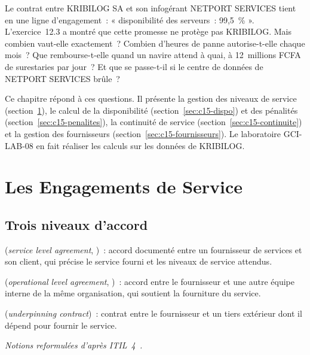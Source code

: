 Le contrat entre KRIBILOG SA et son infogérant NETPORT SERVICES tient en
une ligne d'engagement~: « disponibilité des serveurs~: 99,5~\% ».
L'exercice~12.3 a montré que cette promesse ne protège pas KRIBILOG.
Mais combien vaut-elle exactement~? Combien d'heures de panne
autorise-t-elle chaque mois~? Que rembourse-t-elle quand un navire attend
à quai, à 12~millions FCFA de surestaries par jour~? Et que se passe-t-il si
le centre de données de NETPORT SERVICES brûle~?

Ce chapitre répond à ces questions. Il présente la gestion des niveaux de
service (section~\ref{sec:c15-sla}), le calcul de la disponibilité
(section~\ref{sec:c15-dispo}) et des pénalités (section~\ref{sec:c15-penalites}),
la continuité de service (section~\ref{sec:c15-continuite}) et la gestion
des fournisseurs (section~\ref{sec:c15-fournisseurs}). Le laboratoire
GCI-LAB-08 en fait réaliser les calculs sur les données de KRIBILOG.

\separateur

\section{Les Engagements de Service}
\label{sec:c15-sla}

\subsection{Trois niveaux d'accord}

\begin{boxdef}
(\textit{service level agreement}, )~: accord documenté entre un
fournisseur de services et son client, qui précise le service fourni et
les niveaux de service attendus.

\medskip
{} (\textit{operational level agreement}, )~: accord
entre le fournisseur et une autre équipe interne de la même organisation,
qui soutient la fourniture du service.

\medskip
{}
(\textit{underpinning contract})~: contrat entre le fournisseur et un
tiers extérieur dont il dépend pour fournir le service.
\end{boxdef}
{\small\itshape Notions reformulées d'après ITIL~4~\cite{axelos2019itil4}.}

